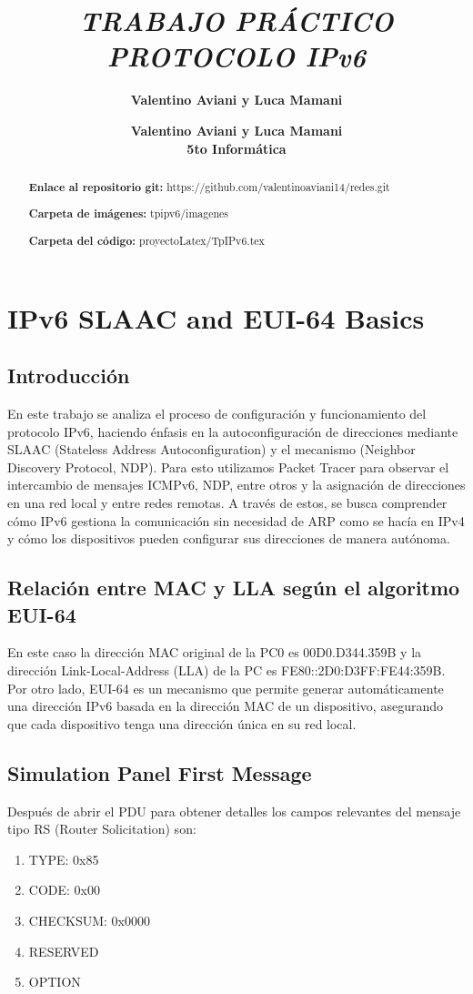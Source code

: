 \documentclass[12pt]{article}
\title{\textbf{\textit{TRABAJO PRÁCTICO PROTOCOLO IPv6}}}
\author{\textbf{Valentino Aviani y Luca Mamani}}
\author{\textbf{Valentino Aviani y Luca Mamani} \\ \textbf{5to Informática}}
\begin{document}
\maketitle

\begin{abstract}
\textbf{Enlace al repositorio git:} https://github.com/valentinoaviani14/redes.git 

\textbf{Carpeta de imágenes:} tpipv6/imagenes

\textbf{Carpeta del código:} proyectoLatex/TpIPv6.tex
\end{abstract}
\tableofcontents
\newpage
\section{IPv6 SLAAC and EUI-64 Basics}
\subsection{Introducción}
En este trabajo se analiza el proceso de configuración y funcionamiento del protocolo IPv6, haciendo énfasis en la autoconfiguración de direcciones mediante SLAAC (Stateless Address Autoconfiguration) y el mecanismo (Neighbor Discovery Protocol, NDP). Para esto utilizamos Packet Tracer para observar el intercambio de mensajes ICMPv6, NDP, entre otros y la asignación de direcciones en una red local y entre redes remotas. A través de estos, se busca comprender cómo IPv6 gestiona la comunicación sin necesidad de ARP como se hacía en IPv4 y cómo los dispositivos pueden configurar sus direcciones de manera autónoma.
\subsection{Relación entre MAC y LLA según el algoritmo EUI-64}
En este caso la dirección MAC original de la PC0 es 00D0.D344.359B y la dirección Link-Local-Address (LLA) de la PC es FE80::2D0:D3FF:FE44:359B. Por otro lado, EUI-64 es un mecanismo que permite generar automáticamente una dirección IPv6 basada en la dirección MAC de un dispositivo, asegurando que cada dispositivo tenga una dirección única en su red local.
\subsection{Simulation Panel First Message}
Después de abrir el PDU para obtener detalles los campos relevantes del mensaje tipo RS (Router Solicitation) son:

\begin{enumerate}
	\item TYPE: 0x85
	
	\item CODE: 0x00
	
	\item CHECKSUM: 0x0000
	
	\item RESERVED
	
	\item OPTION
\end{enumerate}
\end{document}
